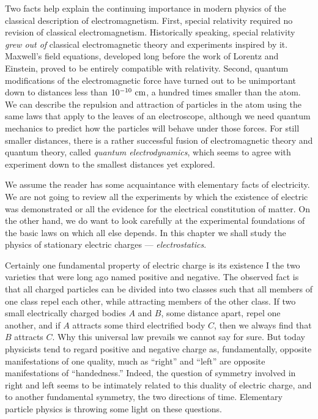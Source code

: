 Two facts help explain the continuing importance in modern
physics of the classical description of electromagnetism. First, special
relativity required no revision of classical electromagnetism. Historically
speaking, special relativity \emph{grew out of} classical electromagnetic
theory and experiments inspired by it. Maxwell's field equations, developed
long before the work of Lorentz and Einstein, proved to be entirely compatible
with relativity. Second, quantum modifications of the electromagnetic force
have turned out to be unimportant down to distances less than $10^{-10}\ \textup{cm}$, a
hundred times smaller than the atom. We can describe the repulsion and
attraction of particles in the atom using the same laws that apply to the
leaves of an electroscope, although we need quantum mechanics to predict how
the particles will behave under those forces. For still smaller distances,
there is a rather successful fusion of electromagnetic theory and quantum
theory, called \emph{quantum electrodynamics}, which seems to agree with
experiment down to the smallest distances yet explored. 

We assume the reader has some acquaintance with elementary
facts of electricity. We are not going to review all the experiments by which
the existence of electric was demonstrated or all the evidence for the
electrical constitution of matter. On the other hand, we do want to look
carefully at the experimental foundations of the basic laws on which all else
depends. In this chapter we shall study the physics of stationary electric
charges --- \emph{electrostatics}.

Certainly one fundamental property of electric charge is its
existence I the two varieties that were long ago named positive and negative.
The observed fact is that all charged particles can be divided into two classes
such that all members of one class repel each other, while attracting members
of the other class. If two small electrically charged bodies $A$ and
$B$, some distance apart, repel one another, and if $A$ attracts some
third electrified body $C$, then we always find that $B$ attracts
$C$. Why this universal law prevails we cannot say for sure. But today
physicists tend to regard positive and negative charge as, fundamentally,
opposite manifestations of one quality, much as ``right'' and ``left'' are
opposite manifestations of ``handedness.'' Indeed, the question of symmetry
involved in right and left seems to be intimately related to this duality of
electric charge, and to another fundamental symmetry, the two directions of
time. Elementary particle physics is throwing some light on these questions.

